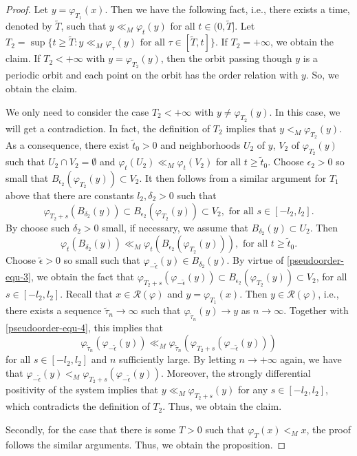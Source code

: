 \documentclass[a4paper,11pt]{article}
\theoremstyle{plain}
\theoremstyle{definition}
\numberwithin{equation}{section}
\begin{document}
\begin{proof}
	Let $y=\varphi_{T_1}(x)$. Then we have the following fact, i.e., there exists a time, denoted by $\tilde{T}$, such that $y\ll_M \varphi_{t}(y)$ for all $t\in (0,\tilde{T}]$. Let $T_2=\sup \{t \geq \tilde{T} \colon y\ll_M \varphi_{\tau}(y) \text{ for all } \tau\in [\tilde{T},t] \}$. If $T_2=+\infty$, we obtain the claim. If $T_2<+\infty$ with $y=\varphi_{T_2}(y)$, then the orbit passing though $y$ is a periodic orbit and each point on the orbit has the order relation with $y$. So, we obtain the claim.
		
	We only need to consider the case $T_2<+\infty$ with $y\neq \varphi_{T_2}(y)$. In this case, we will get a contradiction. In fact, the definition of $T_2$ implies that $y<_M \varphi_{T_2}(y)$. As a consequence, there exist $\tilde{t}_0>0$ and neighborhoods $U_2$ of $y$, $V_2$ of $\varphi_{T_2}(y)$ such that $U_2 \cap V_2 =\emptyset$ and $\varphi_{t}(U_2) \ll_M \varphi_{t}(V_2)$ for all $t\geq \tilde{t}_0$. Choose $\epsilon_2>0$ so small that $B_{\epsilon_2}(\varphi_{T_2}(y))\subset V_2$. It then follows from a similar argument for $T_1$ above that there are constants $l_2,\delta_2 >0$ such that
	\begin{equation}\label{pseudoorder-equ-3}
		\varphi_{T_2+s}(B_{\delta_2}(y))\subset B_{\epsilon_2}(\varphi_{T_2}(y))\subset V_2, \text{ for all } s\in [-l_2,l_2].
	\end{equation}
	By choose such $\delta_2>0$ small, if necessary, we assume that $B_{\delta_2}(y)\subset U_2$. Then 
	\begin{equation}\label{pseudoorder-equ-4}
		\varphi_{t}(B_{\delta_2}(y))\ll_M \varphi_{t}(B_{\epsilon_2}(\varphi_{T_2}(y))), \text{ for all } t\geq \tilde{t}_0.
	\end{equation}
	Choose $\tilde{\epsilon}>0$ so small such that $\varphi_{-\tilde{\epsilon}}(y)\in B_{\delta_2}(y)$. By virtue of \eqref{pseudoorder-equ-3}, we obtain the fact that $\varphi_{T_2+s}(\varphi_{-\tilde{\epsilon}}(y))\subset B_{\epsilon_2}(\varphi_{T_2}(y))\subset V_2$, for all $s\in [-l_2,l_2]$. Recall that $x\in \mathcal{R}(\varphi)$ and $y=\varphi_{T_1}(x)$. Then $y\in \mathcal{R}(\varphi)$, i.e., there exists a sequence $\tilde{\tau}_n \to \infty$ such that $\varphi_{\tilde{\tau}_n}(y)\to y$ as $n\to \infty$.  Together with \eqref{pseudoorder-equ-4}, this implies that
	\[
	\varphi_{\tilde{\tau}_n}(\varphi_{-\tilde{\epsilon}}(y))\ll_M \varphi_{\tilde{\tau}_n}(\varphi_{T_2+s}(\varphi_{-\tilde{\epsilon}}(y)))
	\]
	for all $s\in [-l_2,l_2]$ and $n$ sufficiently large. By letting $n\to +\infty$ again, we have that $\varphi_{-\tilde{\epsilon}}(y)<_M \varphi_{T_2+s}(\varphi_{-\tilde{\epsilon}}(y))$. Moreover, the strongly differential positivity of the system implies that $y\ll_M \varphi_{T_2+s}(y)$ for any $s\in [-l_2,l_2]$, which contradicts the definition of $T_2$. Thus, we obtain the claim.
	
	Secondly, for the case that there is some $T>0$ such that $\varphi_T(x)<_M x$, the proof follows the similar arguments. Thus, we obtain the proposition.
\end{proof}
		
\end{document}
